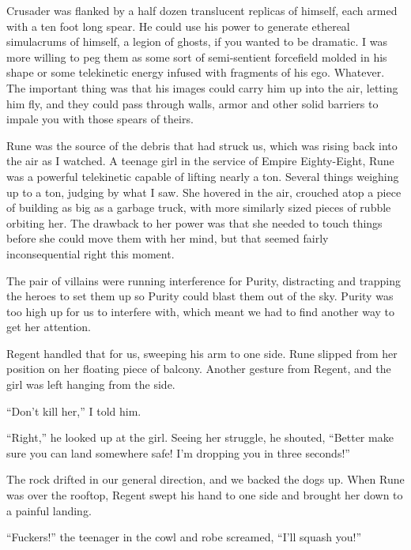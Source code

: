 Crusader was flanked by a half dozen translucent replicas of himself, each armed with a ten foot long spear.  He could use his power to generate ethereal simulacrums of himself, a legion of ghosts, if you wanted to be dramatic.  I was more willing to peg them as some sort of semi-sentient forcefield molded in his shape or some telekinetic energy infused with fragments of his ego.  Whatever.  The important thing was that his images could carry him up into the air, letting him fly, and they could pass through walls, armor and other solid barriers to impale you with those spears of theirs.



Rune was the source of the debris that had struck us, which was rising back into the air as I watched.  A teenage girl in the service of Empire Eighty-Eight, Rune was a powerful telekinetic capable of lifting nearly a ton.  Several things weighing up to a ton, judging by what I saw.  She hovered in the air, crouched atop a piece of building as big as a garbage truck, with more similarly sized pieces of rubble orbiting her.  The drawback to her power was that she needed to touch things before she could move them with her mind, but that seemed fairly inconsequential right this moment.



The pair of villains were running interference for Purity, distracting and trapping the heroes to set them up so Purity could blast them out of the sky.  Purity was too high up for us to interfere with, which meant we had to find another way to get her attention.



Regent handled that for us, sweeping his arm to one side.  Rune slipped from her position on her floating piece of balcony.  Another gesture from Regent, and the girl was left hanging from the side.



``Don't kill her,'' I told him.



``Right,'' he looked up at the girl.  Seeing her struggle, he shouted, ``Better make sure you can land somewhere safe!  I'm dropping you in three seconds!''



The rock drifted in our general direction, and we backed the dogs up.  When Rune was over the rooftop, Regent swept his hand to one side and brought her down to a painful landing.



``Fuckers!'' the teenager in the cowl and robe screamed, ``I'll squash you!''



